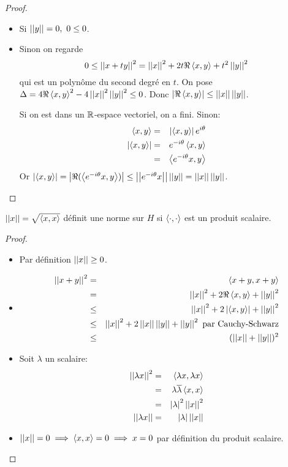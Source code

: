 \begin{proof}
	\begin{itemize}
		\item Si $\norm y = 0, \ 0 \leq 0$.
		\item Sinon on regarde
		      $$ 0 \leq \norm{x + ty}^2 = \norm{x}^2 + 2t\Re \sprod{x}{y} + t^2 \norm{y}^2 $$
		      qui est un polynôme du second degré en $t$.
		      On pose $\Delta = 4\Re \sprod{x}{y}^2 - 4\norm{x}^2\norm{y}^2 \leq 0$.
		      Donc $\abs{\Re \sprod{x}{y}} \leq \norm x \norm y$.

		      Si on est dans un $\R$-espace vectoriel, on a fini. Sinon:
		      \begin{eqnarray*}
			      \sprod x y &=& \abs{\sprod x y} e^{i\theta} \\
			      \abs{\sprod x y} &=& e^{-i\theta} \sprod x y \\
			      &=&    \sprod {e^{-i\theta} x} y
		      \end{eqnarray*}
		      Or $\abs{\sprod x y} = \abs {\Re ( \sprod {e^{-i\theta} x} y )} \leq \norm {e^{-i\theta} x} \norm y = \norm x \norm y$.
	\end{itemize}
\end{proof}


\begin{coro}
	$\norm{x} = \sqrt{\sprod{x}{x}}$ définit une norme sur $H$ si $\sprod{\cdot}{\cdot}$ est un produit scalaire.
\end{coro}

\begin{proof}
	\begin{itemize}
		\item Par définition $\norm{x} \geq 0$.
		\item \begin{eqnarray*}
			      \norm{x + y}^2 &=& \sprod{x+y}{x+y} \\
			      &=&\norm x^2 + 2\Re \sprod{x}{y} + \norm{y}^2 \\
			      &\leq& \norm{x}^2 + 2\abs{\sprod{x}{y}} + \norm{y}^2 \\
			      &\leq& \norm{x}^2 + 2\norm{x}\norm{y} + \norm{y}^2 \text{ par Cauchy-Schwarz} \\
			      &\leq& (\norm{x} + \norm{y})^2
		      \end{eqnarray*}
		\item Soit $\lambda$ un scalaire:
		      \begin{eqnarray*}
			      \norm{\lambda x}^2 &=& \sprod{\lambda x}{\lambda x} \\
			      &=&\lambda \overline \lambda \sprod{x}{x} \\
			      &=& \abs{\lambda}^2 \norm{x}^2 \\
			      \norm{\lambda x} &=& \abs{\lambda} \norm{x}
		      \end{eqnarray*}
		\item $\norm{x} = 0 \implies \sprod{x}{x} = 0 \implies x = 0$ par définition du produit scalaire.
	\end{itemize}
\end{proof}


